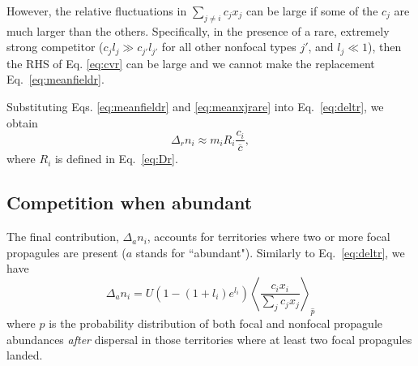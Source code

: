 \documentclass[12pt]{article}
\begin{document}
However, the relative fluctuations in $\sum_{j\neq i} c_j x_j$ can be large if some of the $c_j$ are much larger than the others. Specifically, in the presence of a rare, extremely strong competitor ($c_j l_j\gg c_{j'} l_{j'}$ for all other nonfocal types $j'$, and $l_j\ll 1$), then the RHS of Eq. \eqref{eq:cvr} can be large and we cannot make the replacement Eq.~\eqref{eq:meanfieldr}. 

Substituting Eqs. \eqref{eq:meanfieldr} and \eqref{eq:meanxjrare} into Eq.~\eqref{eq:deltr}, we obtain
\begin{equation}
\Delta_r n_i\approx m_i R_i\frac{c_i}{\overline{c}}, \label{eq:deltrfinal}
\end{equation}
where $R_i$ is defined in Eq.~\eqref{eq:Dr}.

\subsection*{Competition when abundant}

The final contribution, $\Delta_a n_i$, accounts for territories where two or more focal propagules are present ($a$ stands for ``abundant"). Similarly to Eq.~\eqref{eq:deltr}, we have 
\begin{equation}
\Delta_a n_i=U(1-(1+l_i)e^{l_i})\left\langle \frac{c_i x_i}{\sum_j c_j x_j} \right\rangle_{\hat{p}}\label{eq:delta}
\end{equation}
where $\hat{p}$ is the probability distribution of both focal and nonfocal propagule abundances \textit{after} dispersal in those territories where at least two focal propagules landed. 
\end{document}
